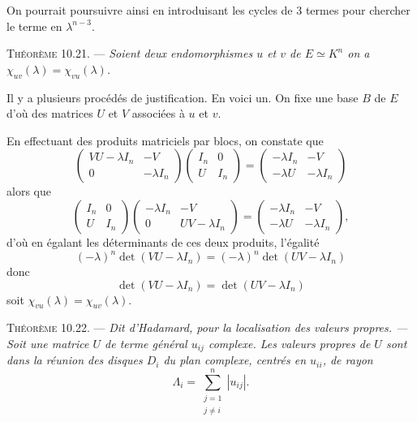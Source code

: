 On pourrait poursuivre ainsi en introduisant les cycles de 3 termes pour chercher le terme en $\lambda^{n-3}$.

\medskip\noindent\textsc{Théorème 10.21.} --- \emph{Soient deux endomorphismes $u$ et $v$ de $E\simeq K^n$ on a $\chi_{uv}(\lambda)=\chi_{vu}(\lambda)$.}

Il y a plusieurs procédés de justification. En voici un. On fixe une base $B$ de $E$ d'où des matrices $U$ et $V$ associées à $u$ et $v$.

En effectuant des produits matriciels par blocs, on constate que
\[
\begin{pmatrix}
VU-\lambda I_n&-V\\
0&-\lambda I_n
\end{pmatrix}
\begin{pmatrix}
I_n&0\\
U&I_n
\end{pmatrix}
=
\begin{pmatrix}
-\lambda I_n&-V\\
-\lambda U&-\lambda I_n
\end{pmatrix}
\]
alors que
\[
\begin{pmatrix}
I_n&0\\
U&I_n
\end{pmatrix}
\begin{pmatrix}
-\lambda I_n&-V\\
0&UV-\lambda I_n
\end{pmatrix}
=
\begin{pmatrix}
-\lambda I_n&-V\\
-\lambda U&-\lambda I_n
\end{pmatrix},
\]
d'où en égalant les déterminants de ces deux produits, l'égalité
\[
(-\lambda)^n\det(VU-\lambda I_n)=(-\lambda)^n\det(UV-\lambda I_n)
\]
donc
\[
\det(VU-\lambda I_n)=\det(UV-\lambda I_n)
\]
soit $\chi_{vu}(\lambda)=\chi_{uv}(\lambda)$. \bookend

\medskip\noindent\textsc{Théorème 10.22.} --- \emph{Dit d'Hadamard, pour la localisation des valeurs propres. --- Soit une matrice $U$ de terme général $u_{ij}$ complexe. Les valeurs propres de $U$ sont dans la réunion des disques $D_i$ du plan complexe, centrés en $u_{ii}$, de rayon}
\[
\Lambda_i=\sum_{\substack{j=1\\j\ne i}}^n|u_{ij}|.
\]

